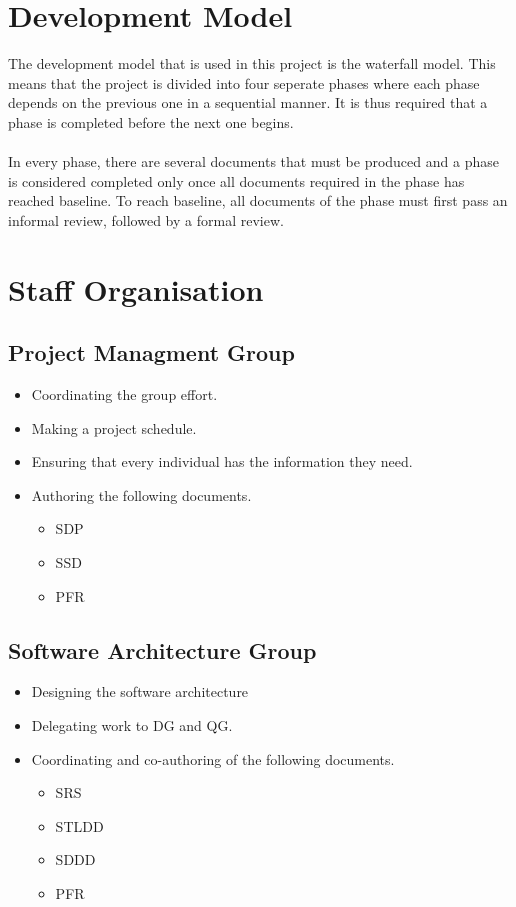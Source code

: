 \documentclass{article}
\begin{document}
\section{Development Model} %
    The development model that is used in this project is the waterfall model. This
    means that the project is divided into four seperate phases where each phase depends
    on the previous one in a sequential manner. It is thus required that a phase is
    completed before the next one begins.
    \\ \\
    In every phase, there are several documents that must be produced and a phase
    is considered completed only once all documents required in the phase has reached baseline.
    To reach baseline, all documents of the phase must first pass an informal review, 
    followed by a formal review.
    
\section{Staff Organisation} %
    \subsection{Project Managment Group}
        \begin{itemize}
            \item Coordinating the group effort.
            \item Making a project schedule.
            \item Ensuring that every individual has the information they need.
            \item Authoring the following documents.
                \begin{itemize}
                    \item SDP
                    \item SSD
                    \item PFR
                \end{itemize} 
        \end{itemize}
    
    \subsection{Software Architecture Group}
        \begin{itemize}
            \item Designing the software architecture
            \item Delegating work to DG and QG.
            \item Coordinating and co-authoring of the following documents.
                \begin{itemize}
                    \item SRS
                    \item STLDD
                    \item SDDD
                    \item PFR
                \end{itemize}
        \end{itemize}
 
\end{document}
